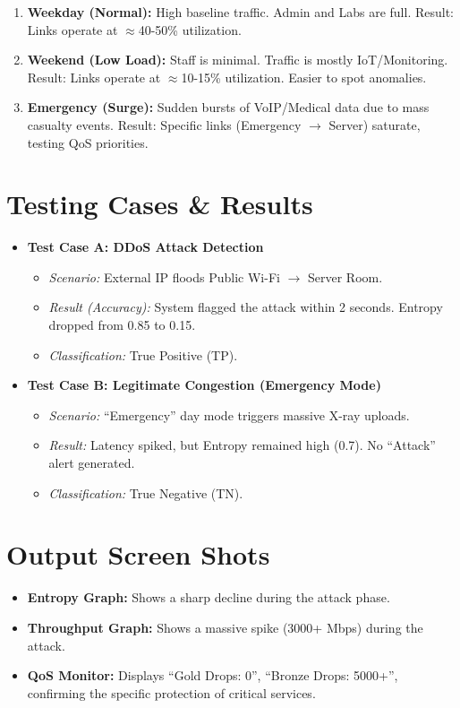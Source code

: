 \documentclass[12pt]{report}
\begin{document}
\begin{enumerate}
    \item \textbf{Weekday (Normal):} High baseline traffic. Admin and Labs are full. Result: Links operate at $\approx$40-50\% utilization.
    \item \textbf{Weekend (Low Load):} Staff is minimal. Traffic is mostly IoT/Monitoring. Result: Links operate at $\approx$10-15\% utilization. Easier to spot anomalies.
    \item \textbf{Emergency (Surge):} Sudden bursts of VoIP/Medical data due to mass casualty events. Result: Specific links (Emergency $\to$ Server) saturate, testing QoS priorities.
\end{enumerate}

\section{Testing Cases \& Results}
\begin{itemize}
    \item \textbf{Test Case A: DDoS Attack Detection}
    \begin{itemize}
        \item \textit{Scenario:} External IP floods Public Wi-Fi $\to$ Server Room.
        \item \textit{Result (Accuracy):} System flagged the attack within 2 seconds. Entropy dropped from 0.85 to 0.15.
        \item \textit{Classification:} True Positive (TP).
    \end{itemize}
    
    \item \textbf{Test Case B: Legitimate Congestion (Emergency Mode)}
    \begin{itemize}
        \item \textit{Scenario:} ``Emergency'' day mode triggers massive X-ray uploads.
        \item \textit{Result:} Latency spiked, but Entropy remained high (0.7). No ``Attack'' alert generated.
        \item \textit{Classification:} True Negative (TN).
    \end{itemize}
\end{itemize}

\section{Output Screen Shots}
\begin{itemize}
    \item \textbf{Entropy Graph:} Shows a sharp decline during the attack phase.
    \item \textbf{Throughput Graph:} Shows a massive spike (3000+ Mbps) during the attack.
    \item \textbf{QoS Monitor:} Displays ``Gold Drops: 0'', ``Bronze Drops: 5000+'', confirming the specific protection of critical services.
\end{itemize}
\end{document}
